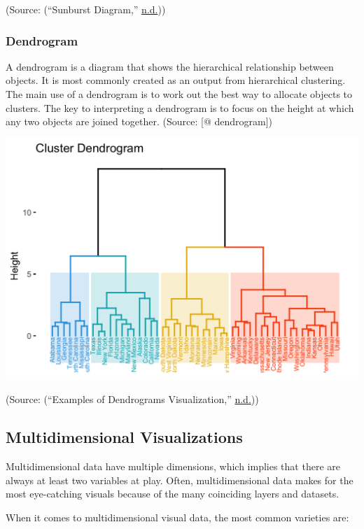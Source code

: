 \documentclass[]{book}
\begin{document}
(Source: (``Sunburst Diagram,'' \protect\hyperlink{ref-sunburst-diag}{n.d.}))

\hypertarget{dendrogram}{%
\subsubsection{Dendrogram}\label{dendrogram}}

A dendrogram is a diagram that shows the hierarchical relationship between objects. It is most commonly created as an output from hierarchical clustering. The main use of a dendrogram is to work out the best way to allocate objects to clusters. The key to interpreting a dendrogram is to focus on the height at which any two objects are joined together.
(Source: {[}@ dendrogram{]})

\includegraphics{images/dendrogram-diag.png}

(Source: (``Examples of Dendrograms Visualization,'' \protect\hyperlink{ref-dendrogram-diag}{n.d.}))

\hypertarget{multidimensional-visualizations}{%
\subsection{Multidimensional Visualizations}\label{multidimensional-visualizations}}

Multidimensional data have multiple dimensions, which implies that there are always at least two variables at play. Often, multidimensional data makes for the most eye-catching visuals because of the many coinciding layers and datasets.

When it comes to multidimensional visual data, the most common varieties are:
\end{document}
